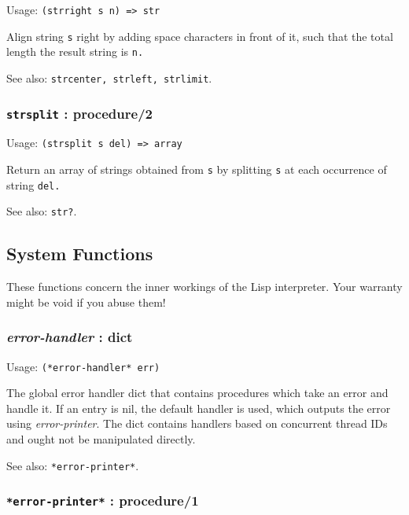 \documentclass[
]{article}
\newcommand{\passthrough}[1]{#1}
\begin{document}
Usage: \passthrough{\lstinline!(strright s n) => str!}

Align string \passthrough{\lstinline!s!} right by adding space
characters in front of it, such that the total length the result string
is \passthrough{\lstinline!n.!}

See also: \passthrough{\lstinline!strcenter, strleft, strlimit!}.

\hypertarget{strsplit-procedure2}{%
\subsubsection{\texorpdfstring{\texttt{strsplit} :
procedure/2}{strsplit : procedure/2}}\label{strsplit-procedure2}}

Usage: \passthrough{\lstinline!(strsplit s del) => array!}

Return an array of strings obtained from \passthrough{\lstinline!s!} by
splitting \passthrough{\lstinline!s!} at each occurrence of string
\passthrough{\lstinline!del.!}

See also: \passthrough{\lstinline!str?!}.

\hypertarget{system-functions}{%
\subsection{System Functions}\label{system-functions}}

These functions concern the inner workings of the Lisp interpreter. Your
warranty might be void if you abuse them!

\hypertarget{error-handler-dict}{%
\subsubsection{\texorpdfstring{\emph{error-handler} :
dict}{error-handler : dict}}\label{error-handler-dict}}

Usage: \passthrough{\lstinline!(*error-handler* err)!}

The global error handler dict that contains procedures which take an
error and handle it. If an entry is nil, the default handler is used,
which outputs the error using \emph{error-printer}. The dict contains
handlers based on concurrent thread IDs and ought not be manipulated
directly.

See also: \passthrough{\lstinline!*error-printer*!}.

\hypertarget{error-printer-procedure1}{%
\subsubsection{\texorpdfstring{\texttt{*error-printer*} :
procedure/1}{*error-printer* : procedure/1}}\label{error-printer-procedure1}}
\end{document}
